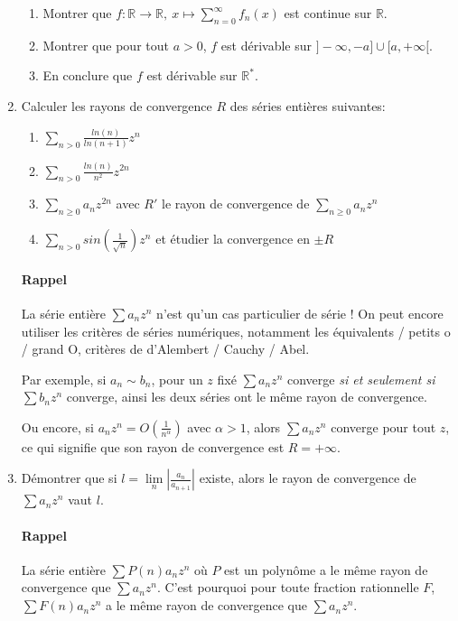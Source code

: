\documentclass[]{article}
\begin{document}
\begin{enumerate}
\begin{enumerate}
	\item Montrer que $\displaystyle f : \mathbb{R} \longrightarrow \mathbb{R}, ~ x \longmapsto \sum_{n=0}^{\infty}f_n(x)$ est continue sur $\mathbb{R}$.
	
	\item Montrer que pour tout $a > 0$, $f$ est dérivable sur $]-\infty, -a] \cup [a, +\infty[$.
	
	\item En conclure que $f$ est dérivable sur $\mathbb{R}^*$.
\end{enumerate}

\item Calculer les rayons de convergence $R$ des séries entières suivantes:
\begin{enumerate}
	\item $\displaystyle \sum_{n > 0}\frac{ln(n)}{ln(n+1)}z^n$
	\item $\displaystyle \sum_{n > 0}\frac{ln(n)}{n^2}z^{2n}$
	\item $\displaystyle \sum_{n \geqslant 0}a_n z^{2n}$ avec $R'$ le rayon de convergence de $\displaystyle \sum_{n \geqslant 0}a_n z^n$
	\item $\displaystyle \sum_{n > 0}sin \left(\frac{1}{\sqrt{n}}\right) z^n$ et étudier la convergence en $\pm R$
	\end{enumerate}

\paragraph{Rappel} La série entière $\sum a_n z^n$ n'est qu'un cas particulier de série ! On peut encore utiliser les critères de séries numériques, notamment les équivalents / petits o / grand O, critères de d'Alembert / Cauchy / Abel.

Par exemple, si $a_n \sim b_n$, pour un $z$ fixé $\sum a_n z^n$ converge \textit{si et seulement si} $\sum b_n z^n$ converge, ainsi les deux séries ont le même rayon de convergence.

Ou encore, si $a_n z^n = O\left( \frac{1}{n^\alpha}\right)$ avec $\alpha > 1$, alors $\sum a_n z^n$ converge pour tout $z$, ce qui signifie que son rayon de convergence est $R= +\infty$.

\item Démontrer que si $l = \lim\limits_{n} \left|\frac{a_n}{a_{n+1}}\right|$ existe, alors le rayon de convergence de $\sum a_nz^n$ vaut $l$.

\paragraph{Rappel} La série entière $\sum P(n)a_n z^n$ où $P$ est un polynôme a le même rayon de convergence que $\sum a_n z^n$. C'est pourquoi pour toute fraction rationnelle $F$, $\sum F(n) a_n z^n$ a le même rayon de convergence que $\sum a_n z^n$.


\end{enumerate}
\end{document}
